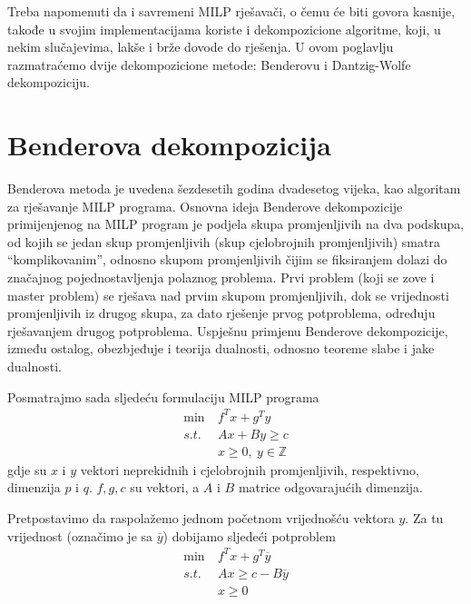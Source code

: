 \documentclass[a4paper, utf8, 11pt, colorlinks]{book}
\begin{document}
Treba napomenuti da i savremeni MILP rješavači, o čemu će biti govora kasnije, takođe u svojim implementacijama koriste i dekompozicione algoritme, koji, u nekim slučajevima, lakše i brže dovode do rješenja. U ovom poglavlju razmatraćemo dvije dekompozicione metode: Benderovu i Dantzig-Wolfe dekompoziciju.
 
 \section{Benderova dekompozicija}
 
 Benderova metoda je uvedena šezdesetih godina dvadesetog vijeka, kao algoritam za rješavanje MILP programa. 
 Osnovna ideja Benderove dekompozicije primijenjenog na MILP program je podjela skupa promjenljivih na dva podskupa, od kojih se jedan skup promjenljivih (skup cjelobrojnih promjenljivih) smatra ``komplikovanim'', odnosno skupom promjenljivih čijim se fiksiranjem dolazi do značajnog pojednostavljenja polaznog problema. Prvi problem (koji se zove i master problem) se rješava nad prvim skupom promjenljivih, dok se vrijednosti promjenljivih iz drugog skupa,  za dato rješenje prvog potproblema, određuju rješavanjem drugog potproblema. Uspješnu primjenu Benderove dekompozicije, između ostalog, obezbjeđuje i teorija dualnosti, odnosno teoreme slabe i jake dualnosti.
 

 Posmatrajmo sada sljedeću formulaciju MILP programa
 \begin{equation}
 \begin{aligned}\label{bender1}
 \min\  &f^Tx+g^Ty\\
 s.t.\  &Ax+By\geqslant c\\
 &x\geqslant 0,\ y \in \mathbb{Z}
 \end{aligned}
\end{equation}
 gdje su $x$ i $y$ vektori neprekidnih i cjelobrojnih promjenljivih, respektivno, dimenzija $p$ i $q$. $f,g,c$ su vektori, a $A$ i $B$ matrice odgovarajućih dimenzija. 
 
 Pretpostavimo da raspolažemo jednom početnom vrijednošću vektora $y$. Za tu vrijednost (označimo je sa $\overline{y}$) dobijamo sljedeći potproblem
  \begin{equation}
 	\begin{aligned}\label{bender2}
\min\ &  f^Tx+g^T\overline{y}\\
  s.t.\ & Ax\geqslant c-B\overline{y}\\
 &x\geqslant 0
  \end{aligned}
\end{equation}
 
\end{document}
